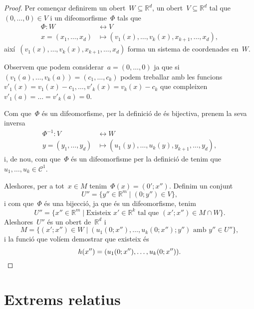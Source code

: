 \documentclass[../../main.tex]{subfiles}
\begin{document}
    \begin{proof}%
        Per començar definirem un obert~\(W\subseteq\mathbb{R}^{d}\), un obert~\(V\subseteq\mathbb{R}^{d}\) tal que~\((0,\dots,0)\in V\) i un difeomorfisme~\(\Phi\) tals que
        \begin{align*}
        \Phi\colon W&\longleftrightarrow V\\
        x=(x_{1},\dots,x_{d})&\longmapsto(v_{1}(x),\dots,v_{k}(x),x_{k+1},\dots,x_{d}),
        \end{align*}
        així~\((v_{1}(x),\dots,v_{k}(x),x_{k+1},\dots,x_{d})\) forma un sistema de coordenades en~\(W\).

        Observem que podem considerar~\(a=(0,\dots,0)\) ja que si~\((v_{1}(a),\dots,v_{k}(a))=(c_{1},\dots,c_{k})\) podem treballar amb les funcions~\(v'_{1}(x)=v_{1}(x)-c_{1},\dots,v'_{k}(x)=v_{k}(x)-c_{k}\) que compleixen~\(v'_{1}(a)=\dots=v'_{k}(a)=0\).

        Com que~\(\Phi\) és un difeomorfisme, per la definició de  és bijectiva, prenem la seva inversa
        \begin{align*}
        \Phi^{-1}\colon V&\longleftrightarrow W\\
        y=(y_{1},\dots,y_{d})&\longmapsto(u_{1}(y),\dots,u_{k}(y),y_{k+1},\dots,y_{d}),
        \end{align*}
        i, de nou, com que~\(\Phi\) és un difeomorfisme per la definició de  tenim que~\(u_{1},\dots,u_{k}\in\mathcal{C}^{1}\).

        Aleshores, per a tot~\(x\in M\) tenim~\(\Phi(x)=(0';x'')\).
        Definim un conjunt
        \[
            U''=\{y''\in\mathbb{R}^{m}\mid(0;y'')\in V\},
        \]
        i com que~\(\Phi\) és una bijecció, ja que és un difeomorfisme, tenim
        \[
            U''=\{x''\in\mathbb{R}^{m}\mid\text{Existeix }x'\in\mathbb{R}^{k}\text{ tal que }(x';x'')\in M\cap W\}.
        \]
        Aleshores~\(U''\) és un obert de~\(\mathbb{R}^{d}\) i %
        \[
            M=\{(x';x'')\in W\mid(u_{1}(0;x''),\dots,u_{k}(0;x'');y'')\text{ amb }y''\in U''\},
        \] %
        i la funció que volíem demostrar que existeix és
        \[
            h(x'')=(u_{1}(0;x''),\dots,u_{k}(0;x'')).\qedhere
        \]
    \end{proof}
\section{Extrems relatius}
\end{document}
